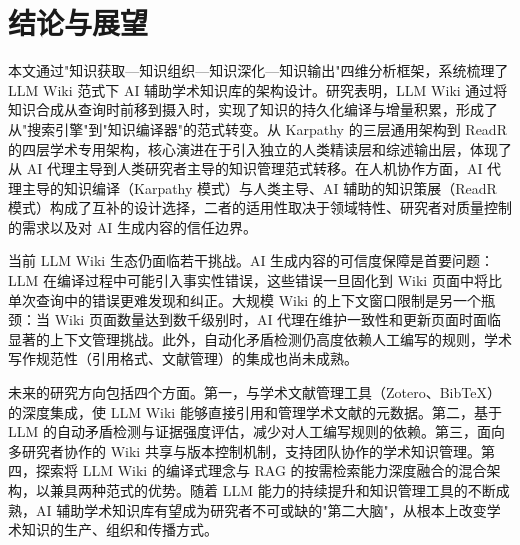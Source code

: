 \documentclass[11pt, a4paper, nonumbering]{SciMasterNoBrand}
\begin{document}
\section{结论与展望}

本文通过"知识获取—知识组织—知识深化—知识输出"四维分析框架，系统梳理了 LLM Wiki 范式下 AI 辅助学术知识库的架构设计。研究表明，LLM Wiki 通过将知识合成从查询时前移到摄入时，实现了知识的持久化编译与增量积累，形成了从"搜索引擎"到"知识编译器"的范式转变。从 Karpathy 的三层通用架构到 ReadR 的四层学术专用架构，核心演进在于引入独立的人类精读层和综述输出层，体现了从 AI 代理主导到人类研究者主导的知识管理范式转移。在人机协作方面，AI 代理主导的知识编译（Karpathy 模式）与人类主导、AI 辅助的知识策展（ReadR 模式）构成了互补的设计选择，二者的适用性取决于领域特性、研究者对质量控制的需求以及对 AI 生成内容的信任边界。

当前 LLM Wiki 生态仍面临若干挑战。AI 生成内容的可信度保障是首要问题：LLM 在编译过程中可能引入事实性错误，这些错误一旦固化到 Wiki 页面中将比单次查询中的错误更难发现和纠正。大规模 Wiki 的上下文窗口限制是另一个瓶颈：当 Wiki 页面数量达到数千级别时，AI 代理在维护一致性和更新页面时面临显著的上下文管理挑战。此外，自动化矛盾检测仍高度依赖人工编写的规则，学术写作规范性（引用格式、文献管理）的集成也尚未成熟。

未来的研究方向包括四个方面。第一，与学术文献管理工具（Zotero、BibTeX）的深度集成，使 LLM Wiki 能够直接引用和管理学术文献的元数据。第二，基于 LLM 的自动矛盾检测与证据强度评估，减少对人工编写规则的依赖。第三，面向多研究者协作的 Wiki 共享与版本控制机制，支持团队协作的学术知识管理。第四，探索将 LLM Wiki 的编译式理念与 RAG 的按需检索能力深度融合的混合架构，以兼具两种范式的优势。随着 LLM 能力的持续提升和知识管理工具的不断成熟，AI 辅助学术知识库有望成为研究者不可或缺的"第二大脑"，从根本上改变学术知识的生产、组织和传播方式。


\end{document}
